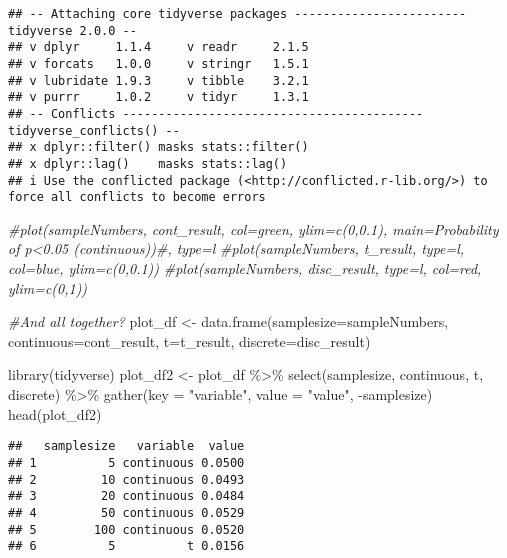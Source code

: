 \documentclass[
]{article}
\newenvironment{Shaded}{\begin{snugshade}}{\end{snugshade}}
\newcommand{\AttributeTok}[1]{\textcolor[rgb]{0.77,0.63,0.00}{#1}}
\newcommand{\CommentTok}[1]{\textcolor[rgb]{0.56,0.35,0.01}{\textit{#1}}}
\newcommand{\FunctionTok}[1]{\textcolor[rgb]{0.00,0.00,0.00}{#1}}
\newcommand{\NormalTok}[1]{#1}
\newcommand{\OtherTok}[1]{\textcolor[rgb]{0.56,0.35,0.01}{#1}}
\newcommand{\SpecialCharTok}[1]{\textcolor[rgb]{0.00,0.00,0.00}{#1}}
\newcommand{\StringTok}[1]{\textcolor[rgb]{0.31,0.60,0.02}{#1}}
\begin{document}
\begin{verbatim}
## -- Attaching core tidyverse packages ------------------------ tidyverse 2.0.0 --
## v dplyr     1.1.4     v readr     2.1.5
## v forcats   1.0.0     v stringr   1.5.1
## v lubridate 1.9.3     v tibble    3.2.1
## v purrr     1.0.2     v tidyr     1.3.1
## -- Conflicts ------------------------------------------ tidyverse_conflicts() --
## x dplyr::filter() masks stats::filter()
## x dplyr::lag()    masks stats::lag()
## i Use the conflicted package (<http://conflicted.r-lib.org/>) to force all conflicts to become errors
\end{verbatim}

\begin{Shaded}
\begin{Highlighting}[]
\CommentTok{\#plot(sampleNumbers, cont\_result, col=\textquotesingle{}green\textquotesingle{}, ylim=c(0,0.1), main=\textquotesingle{}Probability of p\textless{}0.05 (continuous)\textquotesingle{})\#, type=\textquotesingle{}l\textquotesingle{}}
\CommentTok{\#plot(sampleNumbers, t\_result, type=\textquotesingle{}l\textquotesingle{}, col=\textquotesingle{}blue\textquotesingle{}, ylim=c(0,0.1))}
\CommentTok{\#plot(sampleNumbers, disc\_result, type=\textquotesingle{}l\textquotesingle{}, col=\textquotesingle{}red\textquotesingle{}, ylim=c(0,1))}

\CommentTok{\#And all together?}
\NormalTok{plot\_df }\OtherTok{\textless{}{-}} \FunctionTok{data.frame}\NormalTok{(}\AttributeTok{samplesize=}\NormalTok{sampleNumbers, }
                      \AttributeTok{continuous=}\NormalTok{cont\_result,}
                      \AttributeTok{t=}\NormalTok{t\_result,}
                      \AttributeTok{discrete=}\NormalTok{disc\_result)}
                      
\FunctionTok{library}\NormalTok{(tidyverse)}
\NormalTok{plot\_df2 }\OtherTok{\textless{}{-}}\NormalTok{ plot\_df }\SpecialCharTok{\%\textgreater{}\%}
  \FunctionTok{select}\NormalTok{(samplesize, continuous, t, discrete) }\SpecialCharTok{\%\textgreater{}\%}
  \FunctionTok{gather}\NormalTok{(}\AttributeTok{key =} \StringTok{"variable"}\NormalTok{, }\AttributeTok{value =} \StringTok{"value"}\NormalTok{, }\SpecialCharTok{{-}}\NormalTok{samplesize)}
\FunctionTok{head}\NormalTok{(plot\_df2)}
\end{Highlighting}
\end{Shaded}

\begin{verbatim}
##   samplesize   variable  value
## 1          5 continuous 0.0500
## 2         10 continuous 0.0493
## 3         20 continuous 0.0484
## 4         50 continuous 0.0529
## 5        100 continuous 0.0520
## 6          5          t 0.0156
\end{verbatim}
\end{document}
